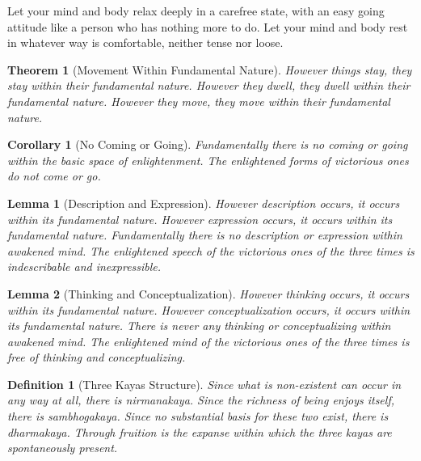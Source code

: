 \documentclass{article}
\newtheorem{corollary}{Corollary}
\newtheorem{definition}{Definition}
\newtheorem{lemma}{Lemma}
\newtheorem{theorem}{Theorem}
\begin{document}
\begin{remark}
   Let your mind and body relax deeply in a carefree
  state, with an easy going attitude like a person who has nothing more to do.
  Let your mind and body rest in whatever way is comfortable, neither tense
  nor loose.
\end{remark}

\begin{theorem}
  [Movement Within Fundamental Nature] However things stay, they stay within
  their fundamental nature. However they dwell, they dwell within their
  fundamental nature. However they move, they move within their fundamental
  nature.
\end{theorem}

\begin{corollary}
  [No Coming or Going] Fundamentally there is no coming or going within the
  basic space of enlightenment. The enlightened forms of victorious ones do
  not come or go.
\end{corollary}

\begin{lemma}
  [Description and Expression] However description occurs, it occurs within
  its fundamental nature. However expression occurs, it occurs within its
  fundamental nature. Fundamentally there is no description or expression
  within awakened mind. The enlightened speech of the victorious ones of the
  three times is indescribable and inexpressible.
\end{lemma}

\begin{lemma}
  [Thinking and Conceptualization] However thinking occurs, it occurs within
  its fundamental nature. However conceptualization occurs, it occurs within
  its fundamental nature. There is never any thinking or conceptualizing
  within awakened mind. The enlightened mind of the victorious ones of the
  three times is free of thinking and conceptualizing.
\end{lemma}

\begin{definition}
  [Three Kayas Structure] Since what is non-existent can occur in any way at
  all, there is nirmanakaya. Since the richness of being enjoys itself, there
  is sambhogakaya. Since no substantial basis for these two exist, there is
  dharmakaya. Through fruition is the expanse within which the three kayas are
  spontaneously present.
\end{definition}
\end{document}

